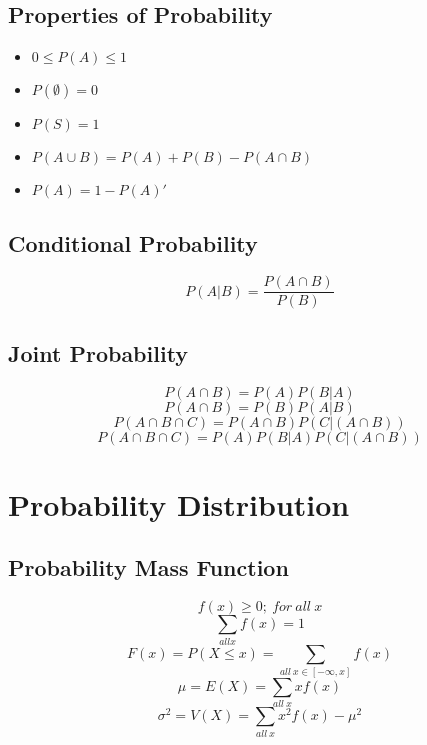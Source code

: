 \documentclass[twocolumn]{article}
\begin{document}
\subsection{Properties of Probability}
\begin{itemize}
    \item $0 \leq P(A) \leq 1$
    \item $P(\emptyset) = 0$
    \item $P(S) = 1$
    \item $P(A \cup B) = P(A) + P(B) - P(A \cap B)$
    \item $P(A) = 1 - P(A)'$
\end{itemize}
\subsection{Conditional Probability}
\begin{equation}
    P(A|B) = \frac{P(A \cap B)}{P(B)}
\end{equation}
\subsection{Joint Probability}
\begin{equation}
    P(A \cap B) = P(A)P(B|A)
\end{equation}
\begin{equation}
    P(A \cap B) = P(B)P(A|B)
\end{equation}
\begin{equation}
    P(A \cap B \cap C) = P(A \cap B)P(C|(A \cap B)) 
\end{equation}
\begin{equation}
    P(A \cap B \cap C) = P(A)P(B|A)P(C|(A \cap B))
\end{equation}
\section{Probability Distribution}
\subsection{Probability Mass Function}
\begin{equation}
    f(x) \geq 0;\ for\ all\ x
\end{equation}
\begin{equation}
    \sum_{all x} f(x) = 1
\end{equation}
\begin{equation}
    F(x) = P(X \leq x) = \sum_{all\ x \in [-\infty,x]} f(x)
\end{equation}
\begin{equation}
    \mu = E(X) = \sum_{all\ x} xf(x)
\end{equation}
\begin{equation}
    \sigma^{2} = V(X) = \sum_{all\ x} x^{2}f(x) - \mu^{2}
\end{equation}
\end{document}
